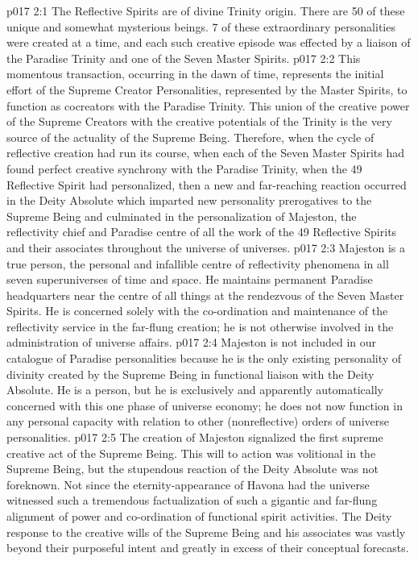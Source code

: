 \vs p017 2:1 The Reflective Spirits are of divine Trinity origin. There are 50 of these unique and somewhat mysterious beings. 7 of these extraordinary personalities were created at a time, and each such creative episode was effected by a liaison of the Paradise Trinity and one of the Seven Master Spirits.
\vs p017 2:2 This momentous transaction, occurring in the dawn of time, represents the initial effort of the Supreme Creator Personalities, represented by the Master Spirits, to function as cocreators with the Paradise Trinity. This union of the creative power of the Supreme Creators with the creative potentials of the Trinity is the very source of the actuality of the Supreme Being. Therefore, when the cycle of reflective creation had run its course, when each of the Seven Master Spirits had found perfect creative synchrony with the Paradise Trinity, when the 49 Reflective Spirit had personalized, then a new and far\hyp{}reaching reaction occurred in the Deity Absolute which imparted new personality prerogatives to the Supreme Being and culminated in the personalization of Majeston, the reflectivity chief and Paradise centre of all the work of the 49 Reflective Spirits and their associates throughout the universe of universes.
\vs p017 2:3 Majeston is a true person, the personal and infallible centre of reflectivity phenomena in all seven superuniverses of time and space. He maintains permanent Paradise headquarters near the centre of all things at the rendezvous of the Seven Master Spirits. He is concerned solely with the co\hyp{}ordination and maintenance of the reflectivity service in the far\hyp{}flung creation; he is not otherwise involved in the administration of universe affairs.
\vs p017 2:4 Majeston is not included in our catalogue of Paradise personalities because he is the only existing personality of divinity created by the Supreme Being in functional liaison with the Deity Absolute. He is a person, but he is exclusively and apparently automatically concerned with this one phase of universe economy; he does not now function in any personal capacity with relation to other (nonreflective) orders of universe personalities.
\vs p017 2:5 \pc The creation of Majeston signalized the first supreme creative act of the Supreme Being. This will to action was volitional in the Supreme Being, but the stupendous reaction of the Deity Absolute was not foreknown. Not since the eternity\hyp{}appearance of Havona had the universe witnessed such a tremendous factualization of such a gigantic and far\hyp{}flung alignment of power and co\hyp{}ordination of functional spirit activities. The Deity response to the creative wills of the Supreme Being and his associates was vastly beyond their purposeful intent and greatly in excess of their conceptual forecasts.
